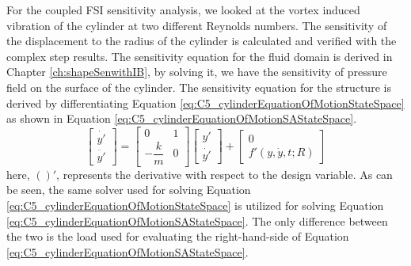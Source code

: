 For the coupled FSI sensitivity analysis, we looked at the vortex induced vibration of the cylinder at two different Reynolds numbers. The sensitivity of the displacement to the radius of the cylinder is calculated and verified with the complex step results. The sensitivity equation for the fluid domain is derived in Chapter \ref{ch:shapeSenwithIB}, by solving it, we have the sensitivity of pressure field on the surface of the cylinder. The sensitivity equation for the structure is derived by differentiating Equation \eqref{eq:C5_cylinderEquationOfMotionStateSpace} as shown in Equation \eqref{eq:C5_cylinderEquationOfMotionSAStateSpace}.
%
\begin{equation}\label{eq:C5_cylinderEquationOfMotionSAStateSpace}
	\begin{bmatrix}
	\dot{y'} \\
	\ddot{y'}
	\end{bmatrix} = 
	\begin{bmatrix}
	0 & 1 \\
	-\dfrac{k}{m} & 0
	\end{bmatrix}
	\begin{bmatrix}
	y' \\
	\dot{y'}
	\end{bmatrix} + 
	\begin{bmatrix}
	0 \\
	f'(y, \dot{y}, t; R)
	\end{bmatrix}
\end{equation}
%
here, $()'$, represents the derivative with respect to the design variable. As can be seen, the same solver used for solving Equation \eqref{eq:C5_cylinderEquationOfMotionStateSpace} is utilized for solving Equation \eqref{eq:C5_cylinderEquationOfMotionSAStateSpace}. The only difference between the two is the load used for evaluating the right-hand-side of Equation \eqref{eq:C5_cylinderEquationOfMotionSAStateSpace}.

